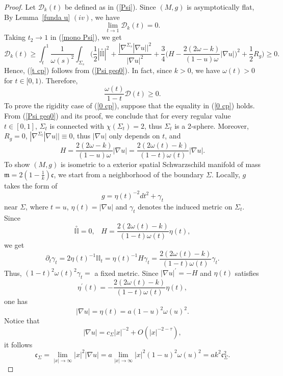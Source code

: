 \documentclass[12pt]{article}
\theoremstyle{definition}
\theoremstyle{plain}
\numberwithin{equation}{section}
\begin{document}
\begin{proof}
Let $ \mathcal{D}_{k}(t) $ be defined as in (\ref{Psi}). Since $ (M,g) $ is asymptotically flat,  By Lemma~\ref{funda u} $ (iv) $, we have
$$
\lim\limits_{t\to1}\mathcal{D}_{k}(t)=0.
$$
Taking $ t_{2}\to 1 $ in (\ref{mono Psi}), we get
\begin{equation}\label{Psi geq0}
\mathcal{D}_{k}(t)\geq \int_{t}^{1}\frac{1}{\omega(s)^{2}}\int_{\Sigma_{s}}\Big(\frac{1}{2}|\overset{\circ}{\mathbb{II}}|^{2}+\frac{|\nabla^{\Sigma_{s}}|\nabla u||^{2}}{|\nabla u|^{2}}+\frac{3}{4}\Big(H-\frac{2(2\omega-k)}{(1-u)\omega}|\nabla u|\Big)^{2}+\frac{1}{2}R_{g}\Big)\geq 0.
\end{equation}
Hence, (\ref{t cp}) follows from (\ref{Psi geq0}). In fact, since $ k>0 $, we have $ \omega(t)>0 $ for $ t\in [0, 1) $. Therefore,  
$$
\frac{\omega(t)}{1-t}\mathcal{D}(t)\geq0.
$$
To prove the rigidity case of (\ref{0 cp}), suppose that the equality in (\ref{0 cp}) holds. From (\ref{Psi geq0}) and its proof, we conclude that for every regular value $ t\in [0,1] $, $ \Sigma_{t} $ is connected with $ \chi(\Sigma_{t})=2 $, thus $ \Sigma_{t} $ is a 2-sphere. Moreover, $ R_{g}=0 $, $ |\nabla^{\Sigma_{t}}|\nabla u||\equiv0 $, thus $ |\nabla u| $ only depends on $ t $, and 
\begin{equation}\label{key}
H=\frac{2(2\omega-k)}{(1-u)\omega}|\nabla u|=\frac{2(2\omega(t)-k)}{(1-t)\omega(t)}|\nabla u|.
\end{equation}
To show $ (M,g) $ is isometric to a exterior spatial Schwarzschild manifold of mass $ \mathfrak{m}=2(1-\frac{1}{k})\mathfrak{c} $, we start from a neighborhood of the boundary $ \Sigma $. Locally, $ g $ takes the form of 
$$
g=\eta(t)^{-2}dt^{2}+\gamma_{t}
$$ 
near $ \Sigma $, where $ t=u $, $ \eta(t)=|\nabla u| $ and $ \gamma_{t} $ denotes the induced metric on $ \Sigma_{t} $. Since 
$$ 
\overset{\circ}{\mathbb{II}}=0,\,\,\,\,\,   H=\frac{2(2\omega(t)-k)}{(1-t)\omega(t)}\eta(t), 
$$ 
we get 
$$
\partial_{t}\gamma_{t}=2\eta(t)^{-1}\mathbb{II}_{t}=\eta(t)^{-1}H\gamma_{t}=\frac{2(2\omega(t)-k)}{(1-t)\omega(t)}\gamma_{t}.
$$
Thus, $ (1-t)^{2}\omega(t)^{2}\gamma_{t}= $ a fixed metric. Since $ |\nabla u|^{\prime}=-H $ and $ \eta(t) $ satisfies 
$$
\eta^{\prime}(t)=-\frac{2(2\omega(t)-k)}{(1-t)\omega(t)}\eta(t),
$$
one has 
$$
|\nabla u|=\eta(t)=a(1-u)^{2}\omega(u)^{2}.
$$
Notice that
$$
|\nabla u|=c_{\Sigma}|x|^{-2}+O(|x|^{-2-\tau}),
$$
it follows
$$
\mathfrak{c}_{\Sigma}=\lim\limits_{|x|\to \infty}|x|^{2}|\nabla u|=a\lim\limits_{|x|\to \infty}|x|^{2}(1-u)^{2}\omega(u)^{2}=ak^{2}\mathfrak{c}_{\Sigma}^{2}.
$$
\end{proof}
\end{document}
